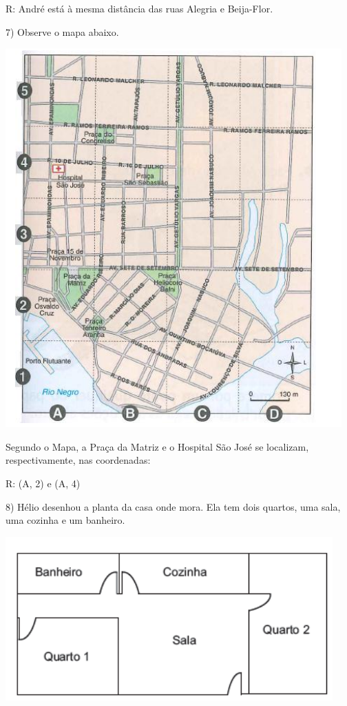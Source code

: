 R: André está à mesma distância das ruas Alegria e Beija-Flor.

7) Observe o mapa abaixo.

\includegraphics[width=5.08333in,height=5.71875in]{./imgSAEB_6_MAT/media/image70.png}

Segundo o Mapa, a Praça da Matriz e o Hospital São José se localizam,
respectivamente, nas coordenadas:

R: (A, 2) e (A, 4)

8) Hélio desenhou a planta da casa onde mora. Ela tem dois quartos, uma
sala, uma cozinha e um banheiro.

\includegraphics[width=4.94792in,height=2.46875in]{./imgSAEB_6_MAT/media/image71.png}

